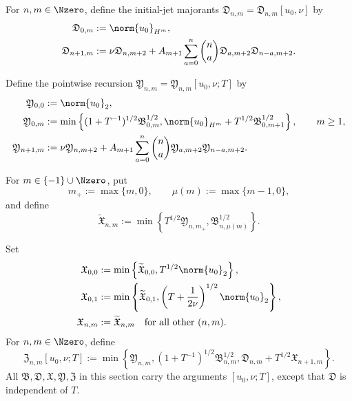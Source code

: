 \begin{definition}
For \(n,m\in\Nzero\), define the initial-jet majorants
\(\mathfrak D_{n,m}=\mathfrak D_{n,m}[u_0,\nu]\) by
\begin{align}
 \mathfrak D_{0,m}&:=\norm{u_0}_{H^m},
 \label{u:eq:qc-D0}\\
 \mathfrak D_{n+1,m}
 &:=\nu\mathfrak D_{n,m+2}
 +A_{m+1}\sum_{a=0}^{n}\binom na
   \mathfrak D_{a,m+2}\mathfrak D_{n-a,m+2}.
 \label{u:eq:qc-Drec}
\end{align}
\begin{samepage}
Define the pointwise recursion
\(\mathfrak Y_{n,m}=\mathfrak Y_{n,m}[u_0,\nu;T]\) by
\begin{align}
 \mathfrak Y_{0,0}&:=\norm{u_0}_2,
 \label{u:eq:qc-Y00}\\
 \mathfrak Y_{0,m}
 &:=\min\left\{
 (1+T^{-1})^{1/2}\mathfrak B_{0,m}^{1/2},
 \norm{u_0}_{H^m}+T^{1/2}\mathfrak B_{0,m+1}^{1/2}
 \right\},
 \qquad m\ge1,
 \label{u:eq:qc-Y0}\\
 \mathfrak Y_{n+1,m}
 &:=\nu\mathfrak Y_{n,m+2}
 +A_{m+1}\sum_{a=0}^{n}\binom na
 \mathfrak Y_{a,m+2}\mathfrak Y_{n-a,m+2}.
 \label{u:eq:qc-Yrec}
\end{align}
\end{samepage}
\begin{samepage}
For \(m\in\{-1\}\cup\Nzero\), put
\[
 m_+:=\max\{m,0\},
 \qquad
 \mu(m):=\max\{m-1,0\},
\]
and define
\begin{equation}
 \widetilde{\mathfrak X}_{n,m}
 :=\min\left\{
 T^{1/2}\mathfrak Y_{n,m_+},
 \mathfrak B_{n,\mu(m)}^{1/2}
 \right\}.
 \label{u:eq:qc-Xraw}
\end{equation}
\end{samepage}
Set
\begin{align}
 \mathfrak X_{0,0}
 &:=\min\left\{\widetilde{\mathfrak X}_{0,0},
 T^{1/2}\norm{u_0}_2\right\},
 \label{u:eq:qc-X00}\\
 \mathfrak X_{0,1}
 &:=\min\left\{\widetilde{\mathfrak X}_{0,1},
 \left(T+\frac1{2\nu}\right)^{1/2}\norm{u_0}_2\right\},
 \label{u:eq:qc-X01}\\
 \mathfrak X_{n,m}&:=\widetilde{\mathfrak X}_{n,m}
 \quad\text{for all other }(n,m).
 \label{u:eq:qc-Xotherwise}
\end{align}
For \(n,m\in\Nzero\), define
\begin{equation}
 \mathfrak Z_{n,m}[u_0,\nu;T]
 :=\min\left\{
 \mathfrak Y_{n,m},
 (1+T^{-1})^{1/2}\mathfrak B_{n,m}^{1/2},
 \mathfrak D_{n,m}+T^{1/2}\mathfrak X_{n+1,m}
 \right\}.
 \label{u:eq:qc-Z}
\end{equation}
All \(\mathfrak B,\mathfrak D,\mathfrak X,\mathfrak Y,\mathfrak Z\) in
this section carry the arguments \([u_0,\nu;T]\), except that
\(\mathfrak D\) is independent of \(T\).
\end{definition}

